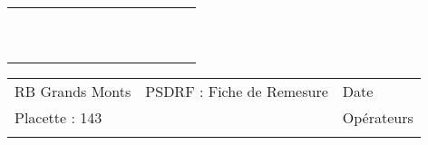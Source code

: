 \documentclass[a4paper, landscape]{article}\usepackage[]{graphicx}\usepackage[]{color}
\begin{document}
{\begin{tabular}{|p{1cm}|p{2cm}|p{1.6cm}|p{1.6cm}|p{1.6cm}|p{1.6cm}|p{1.5cm}|p{1.5cm}|p{1.5cm}|p{1.5cm}|p{1.5cm}|p{7.5cm}|p{5cm}|}
   \rowcolor[gray]{0.95} \hline
 &  &  &  &  &  &  &  &  &  &  &  &  \\ 
   \hline
 &  &  &  &  &  &  &  &  &  &  &  &  \\ 
   \rowcolor[gray]{0.95} \hline
 &  &  &  &  &  &  &  &  &  &  &  &  \\ 
   \hline
 &  &  &  &  &  &  &  &  &  &  &  &  \\ 
   \rowcolor[gray]{0.95} \hline
 &  &  &  &  &  &  &  &  &  &  &  &  \\ 
   \hline
 &  &  &  &  &  &  &  &  &  &  &  &  \\ 
   \rowcolor[gray]{0.95} \hline
 &  &  &  &  &  &  &  &  &  &  &  &  \\ 
   \hline
 &  &  &  &  &  &  &  &  &  &  &  &  \\ 
   \rowcolor[gray]{0.95} \hline
 &  &  &  &  &  &  &  &  &  &  &  &  \\ 
   \hline
 &  &  &  &  &  &  &  &  &  &  &  &  \\ 
   \rowcolor[gray]{0.95} \hline
 &  &  &  &  &  &  &  &  &  &  &  &  \\ 
   \hline
\end{tabular}
}

\begin{tabular}{p{10cm}p{10cm}p{8cm}}
  RB Grands Monts & PSDRF : Fiche de Remesure & Date \\ 
  Placette : 143 &  & Opérateurs \\ 
   &  &  \\ 
  \end{tabular}
\end{document}
